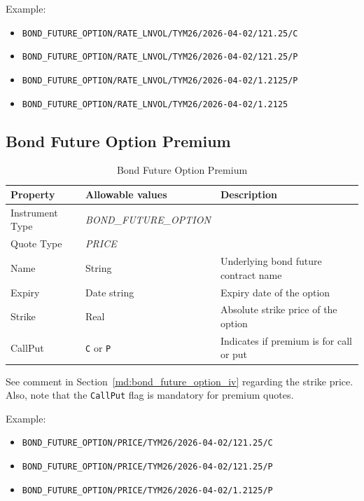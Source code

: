 \medskip
Example:
\begin{itemize}
    \item \lstinline!BOND_FUTURE_OPTION/RATE_LNVOL/TYM26/2026-04-02/121.25/C!
    \item \lstinline!BOND_FUTURE_OPTION/RATE_LNVOL/TYM26/2026-04-02/121.25/P!
    \item \lstinline!BOND_FUTURE_OPTION/RATE_LNVOL/TYM26/2026-04-02/1.2125/P!
    \item \lstinline!BOND_FUTURE_OPTION/RATE_LNVOL/TYM26/2026-04-02/1.2125!
\end{itemize}

\subsection{Bond Future Option Premium}
\label{md:bond_future_option_premium}

\begin{table}[H]
    \centering
    \begin{tabular}{|p{3cm}|p{5.5cm}|p{5cm}|}
    \hline
    {\bf Property} & {\bf Allowable values} & {\bf Description} \\ \hline
    Instrument Type & \emph{BOND\_FUTURE\_OPTION} & \\ \hline
    Quote Type & \emph{PRICE} & \\ \hline
    Name & String & Underlying bond future contract name \\ \hline
    Expiry & Date string & Expiry date of the option \\ \hline
    Strike & Real & Absolute strike price of the option \\ \hline
    CallPut & \lstinline!C! or \lstinline!P! & Indicates if premium is for call or put \\ \hline
    \end{tabular}
    \caption{Bond Future Option Premium}
    \label{tab:bond_future_option_premium_quote}
\end{table}

See comment in Section~\ref{md:bond_future_option_iv} regarding the strike price. Also, note that 
the \lstinline!CallPut! flag is mandatory for premium quotes.

\medskip
Example:
\begin{itemize}
    \item \lstinline!BOND_FUTURE_OPTION/PRICE/TYM26/2026-04-02/121.25/C!
    \item \lstinline!BOND_FUTURE_OPTION/PRICE/TYM26/2026-04-02/121.25/P!
    \item \lstinline!BOND_FUTURE_OPTION/PRICE/TYM26/2026-04-02/1.2125/P!
\end{itemize}

